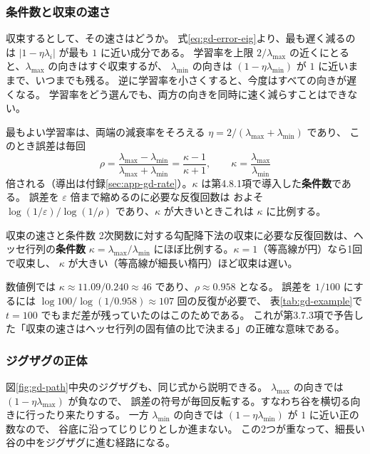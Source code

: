 \subsubsection{条件数と収束の速さ}

収束するとして、その速さはどうか。
式\eqref{eq:gd-error-eig}より、最も遅く減るのは $|1 - \eta\lambda_i|$ が最も $1$ に近い成分である。
学習率を上限 $2/\lambda_{\max}$ の近くにとると、$\lambda_{\max}$ の向きはすぐ収束するが、
$\lambda_{\min}$ の向きは $(1 - \eta\lambda_{\min})$ が $1$ に近いままで、いつまでも残る。
逆に学習率を小さくすると、今度はすべての向きが遅くなる。
学習率をどう選んでも、両方の向きを同時に速く減らすことはできない。

最もよい学習率は、両端の減衰率をそろえる $\eta = 2/(\lambda_{\max} + \lambda_{\min})$ であり、
このとき誤差は毎回
\begin{equation}
  \rho = \frac{\lambda_{\max} - \lambda_{\min}}{\lambda_{\max} + \lambda_{\min}}
       = \frac{\kappa - 1}{\kappa + 1}, \qquad
  \kappa = \frac{\lambda_{\max}}{\lambda_{\min}}
  \label{eq:gd-rate}
\end{equation}
倍される（導出は付録\ref{sec:app-gd-rate}）。$\kappa$ は第4.8.1項で導入した\textbf{条件数}である。
誤差を $\varepsilon$ 倍まで縮めるのに必要な反復回数は
およそ $\log(1/\varepsilon) / \log(1/\rho)$ であり、$\kappa$ が大きいときこれは $\kappa$ に比例する。

\begin{itembox}[l]{収束の速さと条件数}
2次関数に対する勾配降下法の収束に必要な反復回数は、ヘッセ行列の\textbf{条件数} $\kappa = \lambda_{\max}/\lambda_{\min}$
にほぼ比例する。$\kappa = 1$（等高線が円）なら1回で収束し、
$\kappa$ が大きい（等高線が細長い楕円）ほど収束は遅い。
\end{itembox}

数値例では $\kappa \approx 11.09 / 0.240 \approx 46$ であり、$\rho \approx 0.958$ となる。
誤差を $1/100$ にするには $\log 100 / \log(1/0.958) \approx 107$ 回の反復が必要で、
表\ref{tab:gd-example}で $t = 100$ でもまだ差が残っていたのはこのためである。
これが第3.7.3項で予告した「収束の速さはヘッセ行列の固有値の比で決まる」の正確な意味である。

\subsubsection{ジグザグの正体}

図\ref{fig:gd-path}中央のジグザグも、同じ式から説明できる。
$\lambda_{\max}$ の向きでは $(1 - \eta\lambda_{\max})$ が負なので、
誤差の符号が毎回反転する。すなわち谷を横切る向きに行ったり来たりする。
一方 $\lambda_{\min}$ の向きでは $(1 - \eta\lambda_{\min})$ が $1$ に近い正の数なので、
谷底に沿ってじりじりとしか進まない。
この2つが重なって、細長い谷の中をジグザグに進む経路になる。

